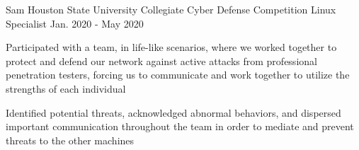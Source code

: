 \begin{cventries}
	\cventry
	  {Sam Houston State University} %
	  {Collegiate Cyber Defense Competition} %
	  {Linux Specialist} %
      {Jan. 2020 - May 2020} %
	  {
	    \begin{cvitems} %
			\item {Participated with a team, in life-like scenarios, where we worked together to protect and defend our network against active attacks from professional penetration testers, forcing us to communicate and work together to utilize the strengths of each individual}
			\item {Identified potential threats, acknowledged abnormal behaviors, and dispersed important communication throughout the team in order to mediate and prevent threats to the other machines}
		\end{cvitems}
	  }


\end{cventries}
